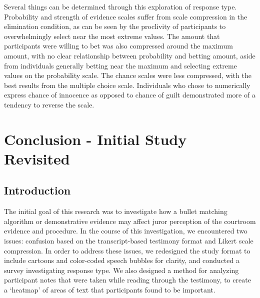 \documentclass[print]{nuthesis}
\begin{document}
Several things can be determined through this exploration of response type.
Probability and strength of evidence scales suffer from scale compression in the elimination condition, as can be seen by the proclivity of participants to overwhelmingly select near the most extreme values.
The amount that participants were willing to bet was also compressed around the maximum amount, with no clear relationship between probability and betting amount, aside from individuals generally betting near the maximum and selecting extreme values on the probability scale.
The chance scales were less compressed, with the best results from the multiple choice scale.
Individuals who chose to numerically express chance of innocence as opposed to chance of guilt demonstrated more of a tendency to reverse the scale.

\hypertarget{finalstudy}{%
\chapter{Conclusion - Initial Study Revisited}\label{finalstudy}}

\hypertarget{introduction-2}{%
\section{Introduction}\label{introduction-2}}

The initial goal of this research was to investigate how a bullet matching algorithm or demonstrative evidence may affect juror perception of the courtroom evidence and procedure.
In the course of this investigation, we encountered two issues: confusion based on the transcript-based testimony format and Likert scale compression.
In order to address these issues, we redesigned the study format to include cartoons and color-coded speech bubbles for clarity, and conducted a survey investigating response type.
We also designed a method for analyzing participant notes that were taken while reading through the testimony, to create a `heatmap' of areas of text that participants found to be important.
\end{document}
